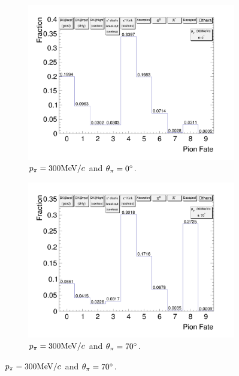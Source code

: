 \begin{figure}[ht]
\begin{subfigure}{\dbfigwid\textwidth}
               \end{subfigure}
              \\
               \begin{subfigure}{\dbfigwid\textwidth}
                    \includegraphics[width=\textwidth]{figures/sel/pion_fate_300_0.png}
                    \caption{$p_{\pi}=300\textrm{MeV}/c$ and $\theta_{\pi}=0^\circ$.}
                    \label{subfig:pi-fate-300-0}
               \end{subfigure}
               \begin{subfigure}{\dbfigwid\textwidth}
                    \includegraphics[width=\textwidth]{figures/sel/pion_fate_300_70.png}
                    \caption{$p_{\pi}=300\textrm{MeV}/c$ and $\theta_{\pi}=70^\circ$.}

\end{subfigure}
\end{figure}
